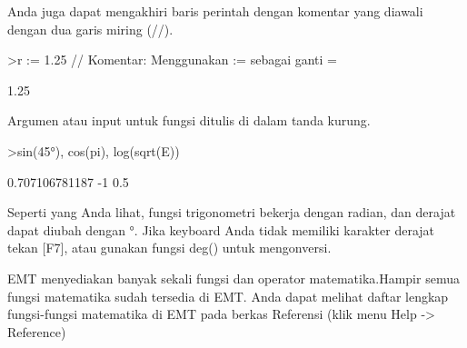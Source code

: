 \documentclass{article}
\begin{document}
\begin{eulernotebook}
\begin{eulercomment}
\begin{eulercomment}
\begin{eulercomment}
Anda juga dapat mengakhiri baris perintah dengan komentar yang diawali
dengan dua garis miring (//).
\end{eulercomment}
\begin{eulerprompt}
>r := 1.25 // Komentar: Menggunakan  := sebagai ganti =
\end{eulerprompt}
\begin{euleroutput}
  1.25
\end{euleroutput}
\begin{eulercomment}
Argumen atau input untuk fungsi ditulis di dalam tanda kurung.
\end{eulercomment}
\begin{eulerprompt}
>sin(45°), cos(pi), log(sqrt(E))
\end{eulerprompt}
\begin{euleroutput}
  0.707106781187
  -1
  0.5
\end{euleroutput}
\begin{eulercomment}
Seperti yang Anda lihat, fungsi trigonometri bekerja dengan radian, dan derajat
dapat diubah dengan °. Jika keyboard Anda tidak memiliki karakter derajat tekan
[F7], atau gunakan fungsi deg() untuk mengonversi.

EMT menyediakan banyak sekali fungsi dan operator matematika.Hampir semua fungsi
matematika sudah tersedia di EMT. Anda dapat melihat daftar lengkap fungsi-fungsi
matematika di EMT pada berkas Referensi (klik menu Help -\textgreater{} Reference)


\end{eulercomment}
\end{eulercomment}
\end{eulercomment}
\end{eulernotebook}
\end{document}
